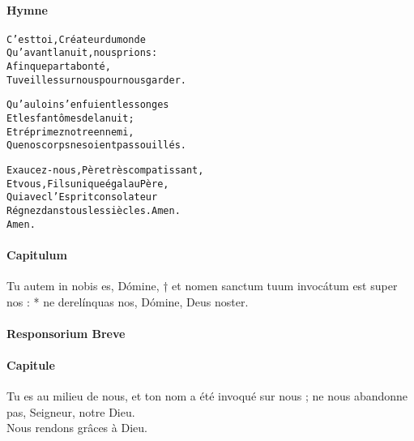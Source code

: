 \documentclass[twoside]{article}
\begin{document}
\begin{paracol}[1]{2}


\switchcolumn

\paragraph{Hymne}
\begin{alltt}\normalfont



             C'est toi, Créateur du monde
             Qu'avant la nuit, nous prions :
             Afin que par ta bonté,
             Tu veilles sur nous pour nous garder.

             Qu'au loin s'enfuient les songes
             Et les fantômes de la nuit ;
             Et réprimez notre ennemi,
             Que nos corps ne soient pas souillés.

             Exaucez-nous, Père très compatissant,
             Et vous, Fils unique égal au Père,
             Qui avec l'Esprit consolateur
             Régnez dans tous les siècles. Amen.
             Amen.
\end{alltt}

\switchcolumn*

\paragraph{Capitulum}

Tu autem in nobis es, Dómine, † et nomen sanctum tuum invocátum est super nos : * ne derelínquas nos, Dómine, Deus noster.


\pagebreak

\paragraph{Responsorium Breve}


\switchcolumn

\paragraph{Capitule}

 \capsaut Tu es au milieu de nous, et ton nom a été invoqué sur nous ; ne nous abandonne pas, Seigneur, notre Dieu.\\
\rr Nous rendons grâces à Dieu.


\end{paracol}
\end{document}
